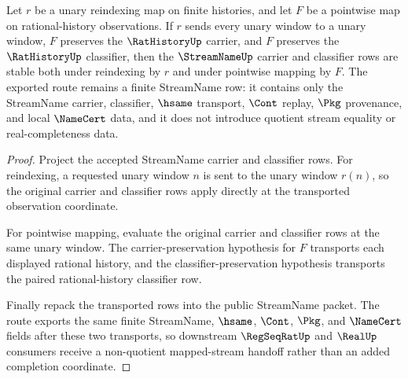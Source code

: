 \begin{theorem}\label{thm:streamname-pointwise-map-stability}
Let $r$ be a unary reindexing map on finite histories, and let $F$ be a pointwise map on rational-history observations. If $r$ sends every unary window to a unary window, $F$ preserves the $\RatHistoryUp$ carrier, and $F$ preserves the $\RatHistoryUp$ classifier, then the $\StreamNameUp$ carrier and classifier rows are stable both under reindexing by $r$ and under pointwise mapping by $F$. The exported route remains a finite StreamName row: it contains only the StreamName carrier, classifier, $\hsame$ transport, $\Cont$ replay, $\Pkg$ provenance, and local $\NameCert$ data, and it does not introduce quotient stream equality or real-completeness data.
\end{theorem}
\begin{proof}
Project the accepted StreamName carrier and classifier rows. For reindexing, a requested unary window $n$ is sent to the unary window $r(n)$, so the original carrier and classifier rows apply directly at the transported observation coordinate.

For pointwise mapping, evaluate the original carrier and classifier rows at the same unary window. The carrier-preservation hypothesis for $F$ transports each displayed rational history, and the classifier-preservation hypothesis transports the paired rational-history classifier row.

Finally repack the transported rows into the public StreamName packet. The route exports the same finite StreamName, $\hsame$, $\Cont$, $\Pkg$, and $\NameCert$ fields after these two transports, so downstream $\RegSeqRatUp$ and $\RealUp$ consumers receive a non-quotient mapped-stream handoff rather than an added completion coordinate.
\end{proof}

